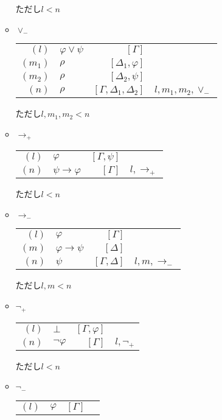 \documentclass[10pt,b5paper,papersize,dvipdfmx]{jsbook}
\begin{document}
\begin{itemize}
\begin{itemize}
      ただし$l<n$
    \item $\lor_-$
      \begin{table}[H]
        \centering
        \begin{tabular}{rlrl}
          $(l)$&$\varphi \lor \psi$&$[\Gamma]$& \\
          $(m_1)$&$\rho$&$[\Delta_1,\varphi]$& \\
          $(m_2)$&$\rho$&$[\Delta_2,\psi]$& \\
          $(n)$&$\rho$&$[\Gamma,\Delta_1,\Delta_2]$&$l,m_1,m_2,\lor_-$
        \end{tabular}
      \end{table}
      ただし$l,m_1,m_2<n$
    \item $\to_+$
      \begin{table}[H]
        \centering
        \begin{tabular}{rlrl}
          $(l)$&$\varphi$&$[\Gamma,\psi]$& \\
          $(n)$&$\psi \to \varphi$&$[\Gamma]$&$l,\to_+$ \\
        \end{tabular}
      \end{table}
      ただし$l<n$
    \item $\to_-$
      \begin{table}[H]
        \centering
        \begin{tabular}{rlrl}
          $(l)$&$\varphi$&$[\Gamma]$& \\
          $(m)$&$\varphi \to \psi$&$[\Delta]$& \\
          $(n)$&$\psi$&$[\Gamma,\Delta]$&$l,m,\to_-$
        \end{tabular}
      \end{table}
      ただし$l,m<n$
    \item $\lnot_+$
      \begin{table}[H]
        \centering
        \begin{tabular}{rlrl}
          $(l)$&$\bot$&$[\Gamma,\varphi]$& \\
          $(n)$&$\lnot \varphi$&$[\Gamma]$&$l,\lnot_+$
        \end{tabular}
      \end{table}
      ただし$l<n$
    \item $\lnot_-$
      \begin{table}[H]
        \centering
        \begin{tabular}{rlrl}
          $(l)$&$\varphi$&$[\Gamma]$& \\

\end{tabular}
\end{table}
\end{itemize}
\end{itemize}
\end{document}
